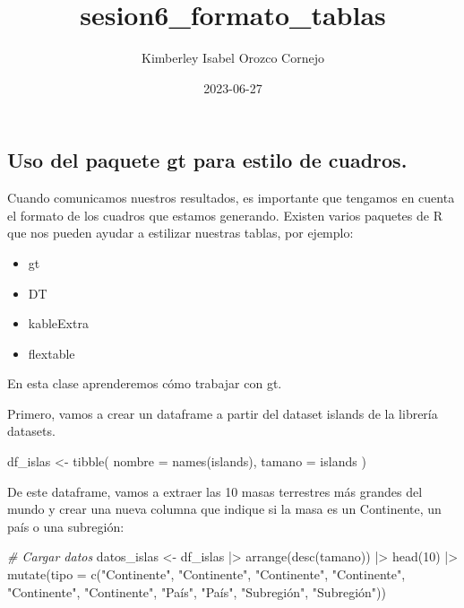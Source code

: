 \documentclass[
]{article}
\title{sesion6\_formato\_tablas}
\author{Kimberley Isabel Orozco Cornejo}
\date{2023-06-27}
\newenvironment{Shaded}{\begin{snugshade}}{\end{snugshade}}
\newcommand{\AttributeTok}[1]{\textcolor[rgb]{0.77,0.63,0.00}{#1}}
\newcommand{\CommentTok}[1]{\textcolor[rgb]{0.56,0.35,0.01}{\textit{#1}}}
\newcommand{\DecValTok}[1]{\textcolor[rgb]{0.00,0.00,0.81}{#1}}
\newcommand{\FunctionTok}[1]{\textcolor[rgb]{0.00,0.00,0.00}{#1}}
\newcommand{\NormalTok}[1]{#1}
\newcommand{\OtherTok}[1]{\textcolor[rgb]{0.56,0.35,0.01}{#1}}
\newcommand{\SpecialCharTok}[1]{\textcolor[rgb]{0.00,0.00,0.00}{#1}}
\newcommand{\StringTok}[1]{\textcolor[rgb]{0.31,0.60,0.02}{#1}}
\providecommand{\tightlist}{%
  \setlength{\itemsep}{0pt}\setlength{\parskip}{0pt}}
\begin{document}
\maketitle

\hypertarget{uso-del-paquete-gt-para-estilo-de-cuadros.}{%
\subsection{Uso del paquete gt para estilo de
cuadros.}\label{uso-del-paquete-gt-para-estilo-de-cuadros.}}

Cuando comunicamos nuestros resultados, es importante que tengamos en
cuenta el formato de los cuadros que estamos generando. Existen varios
paquetes de R que nos pueden ayudar a estilizar nuestras tablas, por
ejemplo:

\begin{itemize}
\tightlist
\item
  gt
\item
  DT
\item
  kableExtra
\item
  flextable
\end{itemize}

En esta clase aprenderemos cómo trabajar con gt.

Primero, vamos a crear un dataframe a partir del dataset islands de la
librería datasets.

\begin{Shaded}
\begin{Highlighting}[]
\NormalTok{df\_islas }\OtherTok{\textless{}{-}} \FunctionTok{tibble}\NormalTok{(}
    \AttributeTok{nombre =} \FunctionTok{names}\NormalTok{(islands),}
    \AttributeTok{tamano =}\NormalTok{ islands}
\NormalTok{  )}
\end{Highlighting}
\end{Shaded}

De este dataframe, vamos a extraer las 10 masas terrestres más grandes
del mundo y crear una nueva columna que indique si la masa es un
Continente, un país o una subregión:

\begin{Shaded}
\begin{Highlighting}[]
\CommentTok{\# Cargar datos}
\NormalTok{datos\_islas }\OtherTok{\textless{}{-}}\NormalTok{ df\_islas }\SpecialCharTok{|\textgreater{}} 
  \FunctionTok{arrange}\NormalTok{(}\FunctionTok{desc}\NormalTok{(tamano)) }\SpecialCharTok{|\textgreater{}} 
  \FunctionTok{head}\NormalTok{(}\DecValTok{10}\NormalTok{) }\SpecialCharTok{|\textgreater{}} 
  \FunctionTok{mutate}\NormalTok{(}\AttributeTok{tipo =} \FunctionTok{c}\NormalTok{(}\StringTok{"Continente"}\NormalTok{, }\StringTok{"Continente"}\NormalTok{, }\StringTok{"Continente"}\NormalTok{, }\StringTok{"Continente"}\NormalTok{, }\StringTok{"Continente"}\NormalTok{, }
                  \StringTok{"Continente"}\NormalTok{, }\StringTok{"País"}\NormalTok{, }\StringTok{"País"}\NormalTok{, }\StringTok{"Subregión"}\NormalTok{, }\StringTok{"Subregión"}\NormalTok{))}
\end{Highlighting}
\end{Shaded}
\end{document}

